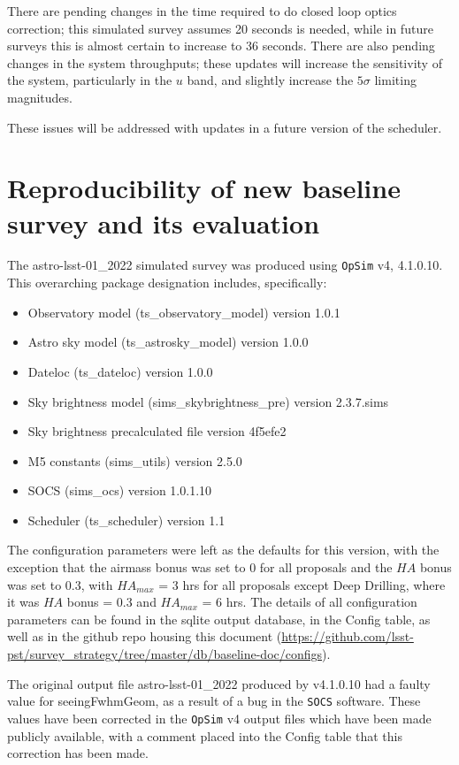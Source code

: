 \documentclass[DM,lsstdraft,authoryear,toc]{lsstdoc}
\newcommand{\opsim}{\texttt{OpSim}\xspace}
\newcommand{\socs}{\texttt{SOCS}\xspace}
\begin{document}
There are pending changes in the time required to do closed loop optics correction; this simulated survey assumes 20 seconds is needed, while in future surveys this is almost certain to increase to 36 seconds.  There are also pending changes in the system throughputs; these updates will increase the sensitivity of the system, particularly in the $u$ band, and slightly increase the $5\sigma$ limiting magnitudes. 

These issues will be addressed with updates in a future version of the scheduler.

\section{Reproducibility of new baseline survey and its evaluation}

The astro-lsst-01\_2022  simulated survey was produced using \opsim v4, 4.1.0.10.  This overarching package designation includes, specifically:
\begin{itemize}
\item Observatory model (ts\_observatory\_model) version 1.0.1
\item Astro sky model (ts\_astrosky\_model) version 1.0.0
\item Dateloc (ts\_dateloc) version 1.0.0
\item Sky brightness model (sims\_skybrightness\_pre) version 2.3.7.sims
\item Sky brightness precalculated file version 4f5efe2
\item M5 constants (sims\_utils) version 2.5.0 
\item SOCS (sims\_ocs) version 1.0.1.10
\item Scheduler (ts\_scheduler) version 1.1
\end{itemize}

The configuration parameters were left as the defaults for this version, with the exception that the airmass bonus was set to 0 for all proposals and the $HA$ bonus was set to 0.3, with $HA_{max}$ = 3 hrs for all proposals except Deep Drilling, where it was $HA$ bonus = 0.3 and $HA_{max}$ = 6 hrs. The details of all configuration parameters can be found in the sqlite output database, in the Config table, as well as in the github repo housing this document (\url{https://github.com/lsst-pst/survey_strategy/tree/master/db/baseline-doc/configs}).

The original output file astro-lsst-01\_2022 produced by v4.1.0.10 had a faulty value for seeingFwhmGeom, as a result of a bug in the \socs software. These values have been corrected in the \opsim v4 output files which have been made publicly available, with a comment placed into the Config table that this correction has been made.
\end{document}
